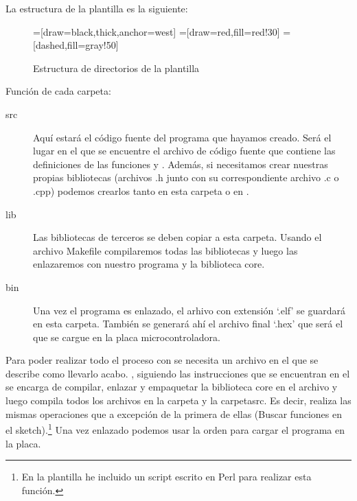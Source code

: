 La estructura de la plantilla es la siguiente:

\begin{figure}[H]
\begin{center}
=[draw=black,thick,anchor=west]
=[draw=red,fill=red!30]
=[dashed,fill=gray!50]
\end{center}
\caption{Estructura de directorios de la plantilla}
\label{plantilla_carpetas}
\end{figure}

Función de cada carpeta:
\begin{description}
	\item[src] Aquí estará el código fuente del programa que hayamos creado. Será el lugar en el que se encuentre el archivo de código fuente  que contiene las definiciones de las funciones  y . Además, si necesitamos crear nuestras propias bibliotecas (archivos .h junto con su correspondiente archivo .c o .cpp) podemos crearlos tanto en esta carpeta o en .
	\item[lib] Las bibliotecas de terceros se deben copiar a esta carpeta. Usando el archivo Makefile compilaremos todas las bibliotecas y luego las enlazaremos con nuestro programa y la biblioteca core.
	\item[bin] Una vez el programa es enlazado, el arhivo con extensión `.elf' se guardará en esta carpeta. También se generará ahí el archivo final `.hex' que será el que se cargue en la placa microcontroladora.
\end{description}

Para poder realizar todo el proceso con  se necesita un archivo  en el que se describe como llevarlo acabo. , siguiendo las instrucciones que se encuentran en el  se encarga de compilar, enlazar y empaquetar la biblioteca core en el archivo  y luego compila todos los archivos en la carpeta  y la carpeta{src}. Es decir, realiza las mismas operaciones que  a excepción de la primera de ellas (Buscar funciones en el sketch).\footnote{En la plantilla he incluido un script escrito en Perl para realizar esta función.} Una vez enlazado podemos usar la orden  para cargar el programa en la placa.

